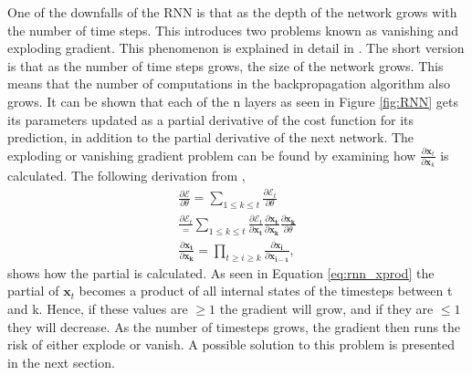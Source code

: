         One of the downfalls of the RNN is that as the depth of the network grows with the number of time steps. This introduces two problems known as vanishing and exploding gradient. This phenomenon is explained in detail in \cite{Pascanu}. The short version is that as the number of time steps grows, the size of the network grows. This means that the number of computations in the backpropagation algorithm also grows. It can be shown that each of the n layers as seen in Figure \ref{fig:RNN} gets its parameters updated as a partial derivative of the cost function for its prediction, in addition to the partial derivative of the next network. The exploding or vanishing gradient problem can be found by examining how $\frac{\partial \bm x_t}{\partial \bm x_k}$ is calculated. The following derivation from \cite{Pascanu},
        \begin{align}
            \frac{\partial \mathcal{E}}{\partial \theta} = \sum_{1\leq k \leq t}\frac{\partial \mathcal{E}_t}{\partial \theta} \nonumber \\
            \frac{\partial \mathcal{E}_t} = \sum_{1\leq k \leq t}\frac{\partial \mathcal{E}_t}{\partial \bm{x_t}} \frac{\partial \bm{x_t}}{\partial \bm{x_k}}\frac{\partial \bm{x_k}}{\partial \theta} \nonumber \\
            \frac{\partial \bm{x_t}}{\partial \bm{x_k}} = \prod_{t \geq i\geq k} \frac{\partial \bm{x_i}}{\partial \bm{x_{i-1}}}\label{eq:rnn_xprod}, 
        \end{align}
        shows how the partial is calculated. As seen in Equation \ref{eq:rnn_xprod} the partial of $\bm x_t$ becomes a product of all internal states of the timesteps between t and k. Hence, if these values are $\geq1$ the gradient will grow, and if they are $\leq 1$ they will decrease. As the number of timesteps grows, the gradient then runs the risk of either explode or vanish. A possible solution to this problem is presented in the next section.  
    
